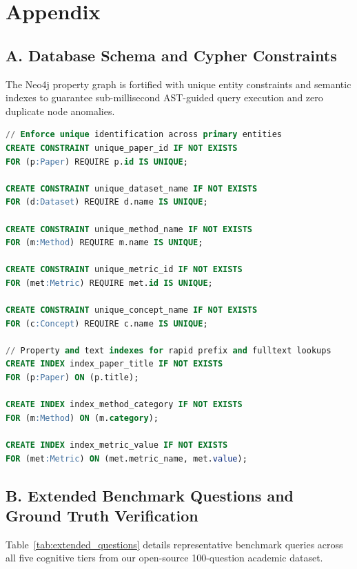 \chapter*{Appendix}
\label{chap:appendix}

\section*{A. Database Schema and Cypher Constraints}
The Neo4j property graph is fortified with unique entity constraints and semantic indexes to guarantee sub-millisecond AST-guided query execution and zero duplicate node anomalies.

\begin{lstlisting}[language=SQL, caption={Neo4j Database Uniqueness Constraints and Property Indexes}]
// Enforce unique identification across primary entities
CREATE CONSTRAINT unique_paper_id IF NOT EXISTS
FOR (p:Paper) REQUIRE p.id IS UNIQUE;

CREATE CONSTRAINT unique_dataset_name IF NOT EXISTS
FOR (d:Dataset) REQUIRE d.name IS UNIQUE;

CREATE CONSTRAINT unique_method_name IF NOT EXISTS
FOR (m:Method) REQUIRE m.name IS UNIQUE;

CREATE CONSTRAINT unique_metric_id IF NOT EXISTS
FOR (met:Metric) REQUIRE met.id IS UNIQUE;

CREATE CONSTRAINT unique_concept_name IF NOT EXISTS
FOR (c:Concept) REQUIRE c.name IS UNIQUE;

// Property and text indexes for rapid prefix and fulltext lookups
CREATE INDEX index_paper_title IF NOT EXISTS
FOR (p:Paper) ON (p.title);

CREATE INDEX index_method_category IF NOT EXISTS
FOR (m:Method) ON (m.category);

CREATE INDEX index_metric_value IF NOT EXISTS
FOR (met:Metric) ON (met.metric_name, met.value);
\end{lstlisting}

\section*{B. Extended Benchmark Questions and Ground Truth Verification}
Table~\ref{tab:extended_questions} details representative benchmark queries across all five cognitive tiers from our open-source 100-question academic dataset.

